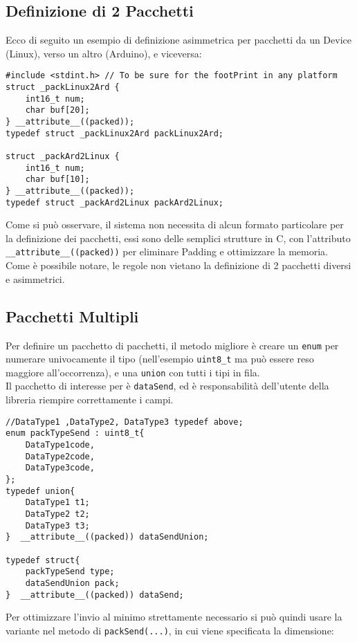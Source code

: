 \subsection{Definizione di 2 Pacchetti}
Ecco di seguito un esempio di definizione asimmetrica per pacchetti da un Device (Linux), verso un altro (Arduino), e viceversa:\\
\begin{lstlisting}[style=cppStyle,caption={Esempio di definizione Pacchetto in EMP},label=lst:EMPpackDef] 
#include <stdint.h>	// To be sure for the footPrint in any platform
struct _packLinux2Ard {
	int16_t num;
	char buf[20];
} __attribute__((packed));
typedef struct _packLinux2Ard packLinux2Ard;

struct _packArd2Linux {
	int16_t num;
	char buf[10];
} __attribute__((packed));
typedef struct _packArd2Linux packArd2Linux;
\end{lstlisting}
\noindent
Come si può osservare, il sistema non necessita di alcun formato particolare per la definizione dei pacchetti, essi sono delle semplici strutture in C, con l'attributo \verb|__attribute__((packed))| per eliminare Padding e ottimizzare la memoria.
Come è possibile notare, le regole non vietano la definizione di 2 pacchetti diversi e asimmetrici.
\newpage

\subsection{Pacchetti Multipli}
Per definire un pacchetto di pacchetti, il metodo migliore è creare un \verb|enum| per numerare univocamente il tipo (nell'esempio \verb|uint8_t| ma può essere reso maggiore all'occorrenza), e una \verb|union| con tutti i tipi in fila.\\
Il pacchetto di interesse per  è \verb|dataSend|, ed è responsabilità dell'utente della libreria riempire correttamente i campi.\\
\begin{lstlisting}[style=cppStyle,caption={Definizione Pacchetti Multipli},label=lst:EMPmultiplePack] 
//DataType1 ,DataType2, DataType3 typedef above;
enum packTypeSend : uint8_t{
	DataType1code,
	DataType2code,
	DataType3code,
};
typedef union{
	DataType1 t1;
	DataType2 t2;
	DataType3 t3;
}  __attribute__((packed)) dataSendUnion;

typedef struct{
	packTypeSend type;
	dataSendUnion pack;
}  __attribute__((packed)) dataSend;
\end{lstlisting}
\noindent
Per ottimizzare l'invio al minimo strettamente necessario si può quindi usare la variante nel metodo di \verb|packSend(...)|, in cui viene specificata la dimensione:

